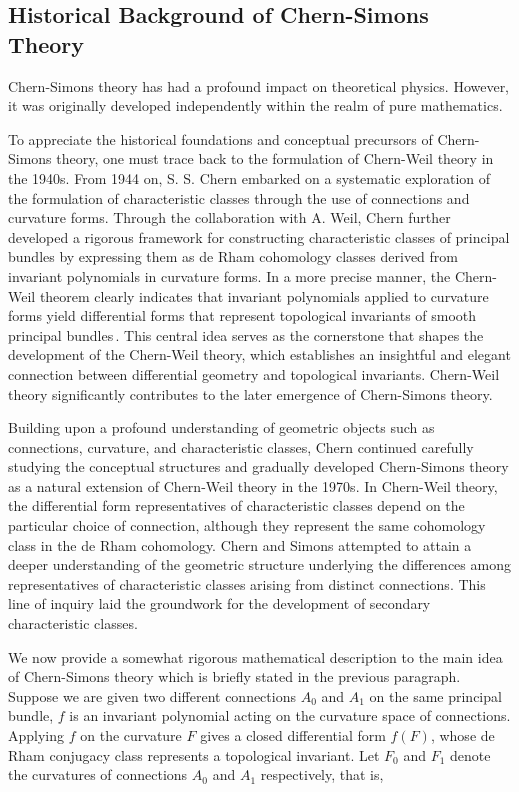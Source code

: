 \subsection{Historical Background of Chern-Simons Theory} %
\par Chern-Simons theory has had a profound impact on theoretical physics. However, it was originally developed independently within the realm of pure mathematics.
\par To appreciate the historical foundations and conceptual precursors of Chern-Simons theory, one must trace back to the formulation of Chern-Weil theory in the 1940s. From 1944 on, S. S. Chern embarked on a systematic exploration of the formulation of characteristic classes through the use of connections and curvature forms. Through the collaboration with A. Weil, Chern further developed a rigorous framework for constructing characteristic classes of principal bundles by expressing them as de Rham cohomology classes derived from invariant polynomials in curvature forms. In a more precise manner, the Chern-Weil theorem clearly indicates that invariant polynomials applied to curvature forms yield differential forms that represent topological invariants of smooth principal bundles\,\cite{chern1946characteristic}. This central idea serves as the cornerstone that shapes the development of the Chern-Weil theory, which establishes an insightful and elegant connection between differential geometry and topological invariants. Chern-Weil theory significantly contributes to the later emergence of Chern-Simons theory.
\par Building upon a profound understanding of geometric objects such as connections, curvature, and characteristic classes, Chern continued carefully studying the conceptual structures and gradually developed Chern-Simons theory as a natural extension of Chern-Weil theory in the 1970s. In Chern-Weil theory, the differential form representatives of characteristic classes depend on the particular choice of connection, although they represent the same cohomology class in the de Rham cohomology. Chern and Simons attempted to attain a deeper understanding of the geometric structure underlying the differences among representatives of characteristic classes arising from distinct connections. This line of inquiry laid the groundwork for the development of secondary characteristic classes. 
\par We now provide a somewhat rigorous mathematical description to the main idea of Chern-Simons theory which is briefly stated in the previous paragraph. Suppose we are given two different connections $A_{0}$ and $A_{1}$ on the same principal bundle, $f$ is an invariant polynomial acting on the curvature space of connections. Applying $f$ on the curvature $F$ gives a closed differential form $f\left(F\right)$, whose de Rham conjugacy class represents a topological invariant. Let $F_{0}$ and $F_{1}$ denote the curvatures of connections $A_{0}$ and $A_{1}$ respectively, that is,
